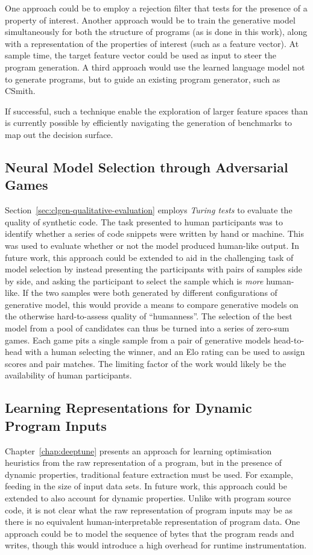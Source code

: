 One approach could be to employ a rejection filter that tests for the presence of a property of interest. Another approach would be to train the generative model simultaneously for both the structure of programs (as is done in this work), along with a representation of the properties of interest (such as a feature vector). At sample time, the target feature vector could be used as input to steer the program generation. A third approach would use the learned language model not to generate programs, but to guide an existing program generator, such as CSmith.

If successful, such a technique enable the exploration of larger feature spaces than is currently possible by efficiently navigating the generation of benchmarks to map out the decision surface.


\subsection{Neural Model Selection through Adversarial Games}

Section~\ref{sec:clgen-qualitative-evaluation} employs \emph{Turing tests} to evaluate the quality of synthetic code. The task presented to human participants was to identify whether a series of code snippets were written by hand or machine. This was used to evaluate whether or not the model produced human-like output. In future work, this approach could be extended to aid in the challenging task of model selection by instead presenting the participants with pairs of samples side by side, and asking the participant to select the sample which is \emph{more} human-like. If the two samples were both generated by different configurations of generative model, this would provide a means to compare generative models on the otherwise hard-to-assess quality of ``humanness''. The selection of the best model from a pool of candidates can thus be turned into a series of zero-sum games. Each game pits a single sample from a pair of generative models head-to-head with a human selecting the winner, and an Elo rating can be used to assign scores and pair matches. The limiting factor of the work would likely be the availability of human participants.


\subsection{Learning Representations for Dynamic Program Inputs}

Chapter~\ref{chap:deeptune} presents an approach for learning optimisation heuristics from the raw representation of a program, but in the presence of dynamic properties, traditional feature extraction must be used. For example, feeding in the size of input data sets. In future work, this approach could be extended to also account for dynamic properties. Unlike with program source code, it is not clear what the raw representation of program inputs may be as there is no equivalent human-interpretable representation of program data. One approach could be to model the sequence of bytes that the program reads and writes, though this would introduce a high overhead for runtime instrumentation.


